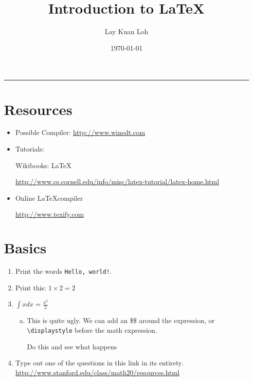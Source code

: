 \documentclass[12pt]{article}
\title{Introduction to \LaTeX}
\author{Lay Kuan Loh}
\date{\today}
\begin{document}
  \maketitle

  \vspace{-0.3in}
  \rule{\linewidth}{0.4pt}



\section{Resources}

\begin{itemize}
  \item Possible Compiler:
	 \url{http://www.winedt.com}
  \item Tutorials:

	 Wikibooks: \LaTeX

	 \url{http://www.cs.cornell.edu/info/misc/latex-tutorial/latex-home.html}
  \item Online \LaTeX compiler

	\url{http://www.texify.com}
\end{itemize}

\section{Basics}

\begin{enumerate}[(1)]
  \item Print the words \verb"Hello, world!".
  \item Print this: $1 \times 2 = 2$
  \item $\int x dx = \frac{x^2}{2}$
  	 \begin{enumerate}[(a)]
	   \item This is quite ugly.
	 	  We can add an \$\$ around the expression,
	  	  or \verb"\displaystyle" before the math expression. 
	   
	 	  Do this and see what happens
	 \end{enumerate}
  \item Type out one of the questions in this link in its entirety. 
	 \url{http://www.stanford.edu/class/math20/resources.html}
\end{enumerate}
\end{document}
